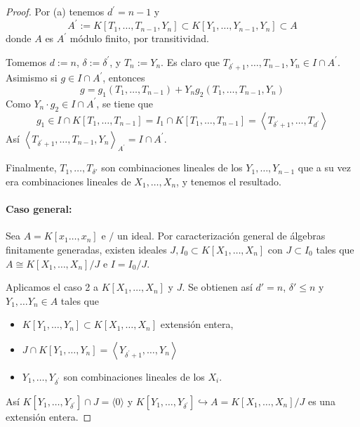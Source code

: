 \documentclass[../main.tex]{subfiles}
\begin{document}
\begin{proof}
Por (a) tenemos $d^{\prime}=n-1$ y
$$A^{\prime}:=K\left[T_{1}, \ldots, T_{n-1}, Y_{n}\right] \subset K\left[Y_{1}, \ldots, Y_{n-1}, Y_{n}\right] \subset A$$
donde $A$ es $A^{\prime}$ módulo finito, por transitividad.

Tomemos $d:=n$, $\delta:=\delta^{\prime}$, y $T_{n}:=Y_{n}$. Es claro que $T_{\delta^{\prime}+1}, \ldots, T_{n-1}, Y_{n} \in I \cap A^{\prime} $. Asimismo si
$g \in I \cap A^{\prime}$, entonces $$g=g_{1}\left(T_{1}, \ldots, T_{n-1}\right)+Y_{n} g_{2}\left(T_{1}, \ldots, T_{n-1}, Y_{n}\right)$$
Como $Y_{n} \cdot g_{2} \in I \cap A^{\prime}$, se tiene que $$g_{1} \in I \cap K\left[T_{1}, \ldots, T_{n-1}\right]=I_{1} \cap K\left[T_{1}, \ldots, T_{n-1}\right]=\left\langle T_{\delta^{\prime}+1}, \ldots, T_{d^{\prime}}\right\rangle$$
Así $\left\langle T_{\delta^{\prime}+1}, \ldots, T_{n-1}, Y_{n}\right\rangle_{A^{\prime}}=I \cap A^{\prime}$.

Finalmente, $T_1, \dots, T_{\delta'}$ son combinaciones lineales de los $Y_1, \dots, Y_{n-1}$ que a su vez era combinaciones lineales de $X_1, \dots, X_n$, y tenemos el resultado.

\paragraph{Caso general:} Sea $A=K\left[x_{1} \ldots, x_{n}\right]$ e $/$ un ideal. Por caracterización general de álgebras finitamente generadas, existen ideales $J, I_0 \subset K[X_1, \dots, X_n]$ con $J \subset I_0$ tales que  $A \cong K\left[X_{1}, \ldots, X_{n}\right] / J$ e  $I=I_{0} / J$.

Aplicamos el caso 2 a $K\left[X_{1}, \ldots, X_{n}\right]$ y $J$. Se obtienen así $d'=n$, $\delta' \leq n$ y $Y_1, \dots Y_n \in A$ tales que
\begin{itemize}
  \item $K\left[Y_{1}, \ldots, Y_{n}\right] \subset K\left[X_{1}, \ldots, X_{n}\right]$ extensión entera,
  \item $J \cap K\left[Y_{1}, \ldots, Y_{n}\right]=\left\langle Y_{\delta^{\prime}+1}, \ldots, Y_{n}\right\rangle$
  \item $Y_{1}, \ldots, Y_{\delta^{\prime}}$ son combinaciones lineales de los $X_{i}$.
\end{itemize}

Así $K\left[Y_{1}, \ldots, Y_{\delta^{\prime}}\right] \cap J=\langle 0\rangle$ y $K\left[Y_{1}, \ldots, Y_{\delta^{\prime}}\right] \hookrightarrow A=K\left[X_{1}, \ldots, X_{n}\right] / J$ es una extensión entera.


\end{proof}
\end{document}
